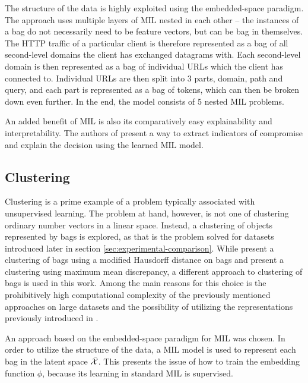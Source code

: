 The structure of the data is highly exploited using the embedded-space paradigm. The approach uses multiple layers of MIL nested in each other -- the instances of a bag do not necessarily need to be feature vectors, but can be bag in themselves. The HTTP traffic of a particular client is therefore represented as a bag of all second-level domains the client has exchanged datagrams with. Each second-level domain is then represented as a bag of individual URLs which the client has connected to. Individual URLs are then split into 3 parts, domain, path and query, and each part is represented as a bag of tokens, which can then be broken down even further. In the end, the model consists of 5 nested MIL problems.

An added benefit of MIL is also its comparatively easy explainability and interpretability. The authors of \cite{pevny_nested_2020} present a way to extract indicators of compromise and explain the decision using the learned MIL model.

\subsection{Clustering}
Clustering is a prime example of a problem typically associated with unsupervised learning. The problem at hand, however, is not one of clustering ordinary number vectors in a linear space. Instead, a clustering of objects represented by bags is explored, as that is the problem solved for datasets introduced later in section \ref{sec:experimental-comparison}. While \cite{wang_solving_2000} present a clustering of bags using a modified Hausdorff distance on bags and \cite{kohout_network_2018} present a clustering using maximum mean discrepancy, a different approach to clustering of bags is used in this work. Among the main reasons for this choice is the prohibitively high computational complexity of the previously mentioned approaches on large datasets and the possibility of utilizing the representations previously introduced in \cite{pevny_nested_2020}.

An approach based on the embedded-space paradigm for MIL was chosen. In order to utilize the structure of the data, a MIL model is used to represent each bag in the latent space \( \bar{\mathcal{X}} \). This presents the issue of how to train the embedding function \( \phi \), because its learning in standard MIL is supervised.

